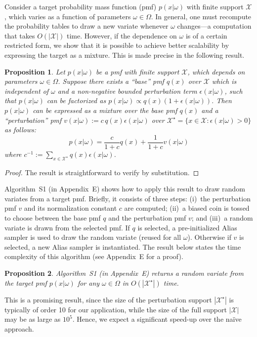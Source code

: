 \documentclass[12pt,letterpaper]{article}
\newcommand{\1}[1]{\mathbb{I}\!\left[#1\right]} %
\newtheorem{proposition}{Proposition}
\begin{document}
Consider a target probability mass function (pmf) $p(x|\omega)$ with 
finite support $\mathcal{X}$, which varies as a function of parameters 
$\omega \in \Omega$.
In general, one must recompute the probability tables to draw a new 
variate whenever $\omega$ changes---a computation that takes 
$O(|\mathcal{X}|)$ time.
However, if the dependence on $\omega$ is of a certain restricted 
form, we show that it is possible to achieve better scalability by 
expressing the target as a mixture.
This is made precise in the following result.
\begin{proposition}
  \label{thm:pert-sampling}
  Let $p(x|\omega)$ be a pmf with finite support $\mathcal{X}$, which depends 
  on parameters $\omega \in \Omega$.
  Suppose there exists a ``base'' pmf $q(x)$ over $\mathcal{X}$ which is 
  independent of $\omega$ and a non-negative bounded perturbation term 
  $\epsilon(x|\omega)$, such that $p(x|\omega)$ can be factorized as 
  $p(x|\omega) \propto q(x) (1 + \epsilon(x|\omega))$.
  Then $p(x|\omega)$ can be expressed as a mixture over the base pmf 
  $q(x)$ and a ``perturbation'' pmf $v(x|\omega) := c \, q(x) 
  \epsilon(x|\omega)$ over $\mathcal{X}^\star = \{x \in \mathcal{X}: 
  \epsilon(x|\omega) > 0\}$ as follows:
  \begin{equation}
  p(x|\omega) = \frac{c}{1 + c} q(x) + \frac{1}{1 + c} v(x|\omega)
  \end{equation}
  where $c^{-1} := 
    \sum_{x \in \mathcal{X}^\star} q(x) \epsilon(x|\omega)$.
\end{proposition}
\begin{proof}
  The result is straightforward to verify by substitution.
\end{proof}

Algorithm~S1 (in Appendix~E) shows how to apply this result to draw random 
variates from a target pmf.
Briefly, it consists of three steps:
(i)~the perturbation pmf $v$ and its normalization constant $c$ are computed;
(ii)~a biased coin is tossed to choose between the base pmf $q$ and the 
perturbation pmf $v$; and
(iii)~a random variate is drawn from the selected pmf.
If $q$ is selected, a pre-initialized Alias sampler is used to draw the 
random variate (reused for all $\omega$).
Otherwise if $v$ is selected, a new Alias sampler is instantiated. 
The result below states the time complexity of this algorithm 
(see Appendix~E for a proof).
\begin{proposition}
  \label{thm:complexity-pert-sampling}
  Algorithm~S1 (in Appendix~E) returns a random variate from the 
  target pmf $p(x|\omega)$ for any $\omega \in \Omega$ in 
  $O(|\mathcal{X}^\star|)$ time.
\end{proposition}
This is a promising result, since the size of the perturbation support 
$|\mathcal{X}^\star|$ is typically of order 10 for our application, while the 
size of the full support $|\mathcal{X}|$ may be as large as $10^5$.
Hence, we expect a significant speed-up over the na\"{i}ve approach.
\end{document}
